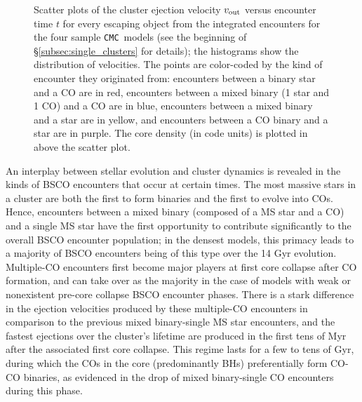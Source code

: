 \documentclass[twocolumn]{aastex631}
\newcommand{\CMC}{\texttt{CMC}}
\begin{document}
\begin{figure*}
    \caption{
        Scatter plots of the cluster ejection velocity $v_{\rm out}$ versus encounter time $t$ for every escaping object from the integrated encounters for the four sample \CMC\ models (see the beginning of \S\ref{subsec:single_clusters} for details); the histograms show the distribution of velocities.
        The points are color-coded by the kind of encounter they originated from: encounters between a binary star and a CO are in red, encounters between a mixed binary (1 star and 1 CO) and a CO are in blue, encounters between a mixed binary and a star are in yellow, and encounters between a CO binary and a star are in purple.
        The core density (in code units) is plotted in above the scatter plot.
    }
    \label{fig:cmc_single_clusters}
\end{figure*}

An interplay between stellar evolution and cluster dynamics is revealed in the kinds of BSCO encounters that occur at certain times.
The most massive stars in a cluster are both the first to form binaries and the first to evolve into COs.
Hence, encounters between a mixed binary (composed of a MS star and a CO) and a single MS star have the first opportunity to contribute significantly to the overall BSCO encounter population; in the densest models, this primacy leads to a majority of BSCO encounters being of this type over the 14 Gyr evolution.
Multiple-CO encounters first become major players at first core collapse after CO formation, and can take over as the majority in the case of models with weak or nonexistent pre-core collapse BSCO encounter phases.
There is a stark difference in the ejection velocities produced by these multiple-CO encounters in comparison to the previous mixed binary-single MS star encounters, and the fastest ejections over the cluster's lifetime are produced in the first tens of Myr after the associated first core collapse.
This regime lasts for a few to tens of Gyr, during which the COs in the core (predominantly BHs) preferentially form CO-CO binaries, as evidenced in the drop of mixed binary-single CO encounters during this phase.
\end{document}
